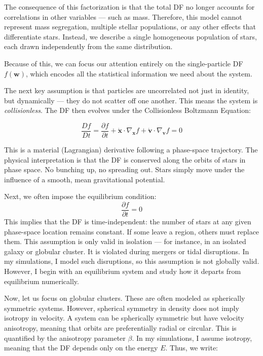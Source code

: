         The consequence of this factorization is that the total DF no longer accounts for correlations in other variables — such as mass. Therefore, this model cannot represent mass segregation, multiple stellar populations, or any other effects that differentiate stars. Instead, we describe a single homogeneous population of stars, each drawn independently from the same distribution.

        Because of this, we can focus our attention entirely on the single-particle DF \( f(\mathbf{w}) \), which encodes all the statistical information we need about the system.

        The next key assumption is that particles are uncorrelated not just in identity, but dynamically — they do not scatter off one another. This means the system is \textit{collisionless}. The DF then evolves under the Collisionless Boltzmann Equation:

        \begin{equation}
        \frac{Df}{Dt} = \frac{\partial f}{\partial t} + \dot{\mathbf{x}} \cdot \nabla_{\mathbf{x}} f + \dot{\mathbf{v}} \cdot \nabla_{\mathbf{v}} f = 0
        \end{equation}

        This is a material (Lagrangian) derivative following a phase-space trajectory. The physical interpretation is that the DF is conserved along the orbits of stars in phase space. No bunching up, no spreading out. Stars simply move under the influence of a smooth, mean gravitational potential.

        Next, we often impose the equilibrium condition:
        \[
        \frac{\partial f}{\partial t} = 0
        \]
        This implies that the DF is time-independent: the number of stars at any given phase-space location remains constant. If some leave a region, others must replace them. This assumption is only valid in isolation — for instance, in an isolated galaxy or globular cluster. It is violated during mergers or tidal disruptions. In my simulations, I model such disruptions, so this assumption is not globally valid. However, I begin with an equilibrium system and study how it departs from equilibrium numerically.

        Now, let us focus on globular clusters. These are often modeled as spherically symmetric systems. However, spherical symmetry in density does not imply isotropy in velocity. A system can be spherically symmetric but have velocity anisotropy, meaning that orbits are preferentially radial or circular. This is quantified by the anisotropy parameter \( \beta \). In my simulations, I assume isotropy, meaning that the DF depends only on the energy \( E \). Thus, we write:

